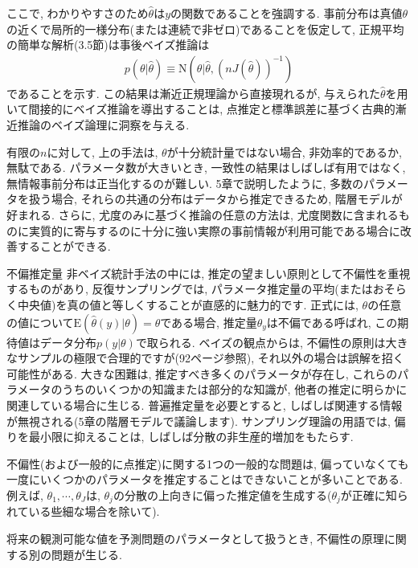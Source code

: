 \documentclass[10pt,dvipdfmx,a4]{beamer}
\newcommand{\eqn}[1]{\begin{align*}#1\end{align*}}
\begin{document}
\begin{frame}
ここで, わかりやすさのため$\hat{\theta}$は$y$の関数であることを強調する.
事前分布は真値$\theta$の近くで局所的一様分布(または連続で非ゼロ)であることを仮定して, 正規平均の簡単な解析(3.5節)は事後ベイズ推論は
\eqn{p(\theta|\hat{\theta})\equiv \text{N}(\theta|\hat{\theta}, (nJ(\hat{\theta}))^{-1})}
であることを示す.
この結果は漸近正規理論から直接現れるが, 与えられた$\hat{\theta}$を用いて間接的にベイズ推論を導出することは, 点推定と標準誤差に基づく古典的漸近推論のベイズ論理に洞察を与える.

有限の$n$に対して, 上の手法は, $\theta$が十分統計量ではない場合, 非効率的であるか, 無駄である.
パラメータ数が大きいとき, 一致性の結果はしばしば有用ではなく, 無情報事前分布は正当化するのが難しい.
5章で説明したように, 多数のパラメータを扱う場合, それらの共通の分布はデータから推定できるため, 階層モデルが好まれる.
さらに, 尤度のみに基づく推論の任意の方法は, 尤度関数に含まれるものに実質的に寄与するのに十分に強い実際の事前情報が利用可能である場合に改善することができる.
\end{frame}


\begin{frame}{不偏推定量}
非ベイズ統計手法の中には, 推定の望ましい原則として不偏性を重視するものがあり, 反復サンプリングでは, パラメータ推定量の平均(またはおそらく中央値)を真の値と等しくすることが直感的に魅力的です.
正式には, $\theta$の任意の値について$\text{E}(\hat{\theta}(y)|\theta)=\theta$である場合, 推定量$\theta_y$は不偏である呼ばれ, この期待値はデータ分布$p(y|\theta)$で取られる.
ベイズの観点からは, 不偏性の原則は大きなサンプルの極限で合理的ですが(92ページ参照), それ以外の場合は誤解を招く可能性がある.
大きな困難は, 推定すべき多くのパラメータが存在し, これらのパラメータのうちのいくつかの知識または部分的な知識が, 他者の推定に明らかに関連している場合に生じる.
普遍推定量を必要とすると, しばしば関連する情報が無視される(5章の階層モデルで議論します).
サンプリング理論の用語では, 偏りを最小限に抑えることは, しばしば分散の非生産的増加をもたらす.

不偏性(および一般的に点推定)に関する1つの一般的な問題は, 偏っていなくても一度にいくつかのパラメータを推定することはできないことが多いことである.
例えば, $\theta_1, \cdots,\theta_J$は, $\theta_j$の分散の上向きに偏った推定値を生成する($\theta_j$が正確に知られている些細な場合を除いて).

将来の観測可能な値を予測問題のパラメータとして扱うとき, 不偏性の原理に関する別の問題が生じる.
\end{frame}
\end{document}
